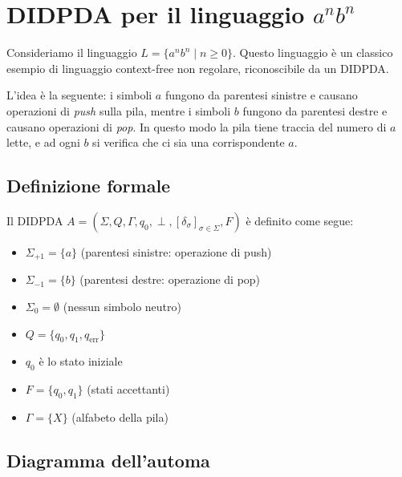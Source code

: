 \documentclass[a4paper,12pt]{article}
\begin{document}
\section*{DIDPDA per il linguaggio $a^n b^n$}

Consideriamo il linguaggio $L = \{a^n b^n \mid n \geq 0\}$.
Questo linguaggio è un classico esempio di linguaggio context-free non regolare, riconoscibile da un DIDPDA.

L'idea è la seguente: i simboli $a$ fungono da parentesi sinistre e causano operazioni di \textit{push} sulla pila, mentre i simboli $b$ fungono da parentesi destre e causano operazioni di \textit{pop}.
In questo modo la pila tiene traccia del numero di $a$ lette, e ad ogni $b$ si verifica che ci sia una corrispondente $a$.

\subsection*{Definizione formale}

Il DIDPDA $A = (\Sigma, Q, \Gamma, q_0, \perp, [\delta_\sigma]_{\sigma \in \Sigma}, F)$ è definito come segue:

\begin{itemize}
    \item $\Sigma_{+1} = \{a\}$ (parentesi sinistre: operazione di push)
    \item $\Sigma_{-1} = \{b\}$ (parentesi destre: operazione di pop)
    \item $\Sigma_0 = \emptyset$ (nessun simbolo neutro)
    \item $Q = \{q_0, q_1, q_{\text{err}}\}$
    \item $q_0$ è lo stato iniziale
    \item $F = \{q_0, q_1\}$ (stati accettanti)
    \item $\Gamma = \{X\}$ (alfabeto della pila)
\end{itemize}

\subsection*{Diagramma dell'automa}
\end{document}

